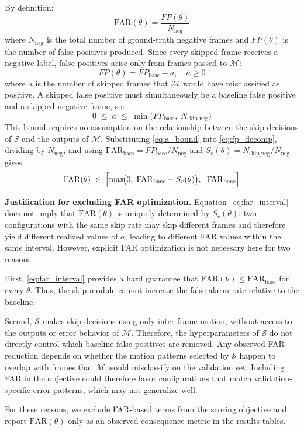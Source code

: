 By definition:
\begin{equation}\label{eq:far_def}
    \mathrm{FAR}(\theta) = \frac{FP(\theta)}{N_{\text{neg}}}
\end{equation}
where $N_{\text{neg}}$ is the total number of ground-truth negative frames
and $FP(\theta)$ is the number of false positives produced.
Since every skipped frame receives a negative label, false positives arise
only from frames passed to $\mathcal{M}$:
\begin{equation}\label{eq:fp_decomp}
    FP(\theta) = FP_{\text{base}} - a, \quad a \geq 0
\end{equation}
where $a$ is the number of skipped frames that $\mathcal{M}$ would have
misclassified as positive.
A skipped false positive must simultaneously be a baseline false positive
and a skipped negative frame, so:
\begin{equation}\label{eq:a_bound}
    0 \;\leq\; a \;\leq\; \min\!\bigl(FP_{\text{base}},\;N_{\text{skip\_neg}}\bigr)
\end{equation}
This bound requires no assumption on the relationship between the skip
decisions of $\mathcal{S}$ and the outputs of $\mathcal{M}$.
Substituting \eqref{eq:a_bound} into \eqref{eq:fp_decomp}, dividing by
$N_{\text{neg}}$, and using
$\mathrm{FAR}_{\text{base}} = FP_{\text{base}}/N_{\text{neg}}$ and
$S_r(\theta) = N_{\text{skip\_neg}}/N_{\text{neg}}$ gives:
\begin{equation}\label{eq:far_interval}
    \mathrm{FAR}(\theta)
    \;\in\;
    \Bigl[
        \max\!\bigl(0,\;\mathrm{FAR}_{\text{base}} - S_r(\theta)\bigr),
        \;\;
        \mathrm{FAR}_{\text{base}}
    \Bigr]
\end{equation}

\textbf{Justification for excluding FAR optimization.}
Equation~\eqref{eq:far_interval} does not imply that $\mathrm{FAR}(\theta)$
is uniquely determined by $S_r(\theta)$: two configurations with the same
skip rate may skip different frames and therefore yield different realized
values of $a$, leading to different FAR values within the same interval.
However, explicit FAR optimization is not necessary here for two reasons.

First, \eqref{eq:far_interval} provides a hard guarantee that
$\mathrm{FAR}(\theta) \leq \mathrm{FAR}_{\text{base}}$ for every $\theta$.
Thus, the skip module cannot increase the false alarm rate relative to the
baseline.

Second, $\mathcal{S}$ makes skip decisions using only inter-frame motion,
without access to the outputs or error behavior of $\mathcal{M}$.
Therefore, the hyperparameters of $\mathcal{S}$ do not directly control
which baseline false positives are removed.
Any observed FAR reduction depends on whether the motion patterns selected
by $\mathcal{S}$ happen to overlap with frames that $\mathcal{M}$ would
misclassify on the validation set.
Including FAR in the objective could therefore favor configurations that
match validation-specific error patterns, which may not generalize well.

For these reasons, we exclude FAR-based terms from the scoring objective
and report $\mathrm{FAR}(\theta)$ only as an observed consequence metric
in the results tables.